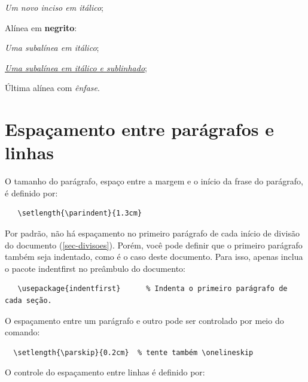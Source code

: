 \begin{alineas}
  \begin{incisos}
    \item \textit{Um novo inciso em itálico};
  \end{incisos}
  
  \item Alínea em \textbf{negrito}:
  
  \begin{subalineas}
    \item \textit{Uma subalínea em itálico};
    \item \underline{\textit{Uma subalínea em itálico e sublinhado}}; 
  \end{subalineas}
  
  \item Última alínea com \emph{ênfase}.
  
\end{alineas}

\section{Espaçamento entre parágrafos e linhas}

O tamanho do parágrafo, espaço entre a margem
e o início da frase do parágrafo, é definido por:

\begin{verbatim}
   \setlength{\parindent}{1.3cm}
\end{verbatim}

Por padrão, não há espaçamento no
primeiro parágrafo de cada início de divisão do documento
(\autoref{sec-divisoes}). Porém, você pode definir que o primeiro parágrafo
também seja indentado, como é o caso deste documento. Para isso, apenas inclua o
pacote \textsf{indentfirst} no preâmbulo do documento:

\begin{verbatim}
   \usepackage{indentfirst}      % Indenta o primeiro parágrafo de cada seção.
\end{verbatim}

O espaçamento entre um parágrafo e outro
pode ser controlado por meio do comando:

\begin{verbatim}
  \setlength{\parskip}{0.2cm}  % tente também \onelineskip
\end{verbatim}

O controle do espaçamento entre linhas é
definido por:

